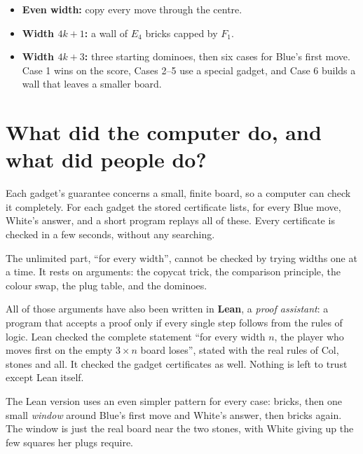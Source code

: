 \documentclass[11pt]{article}
\begin{document}
\begin{center}
\end{center}

\begin{itemize}
\item \textbf{Even width:} copy every move through the centre.
\item \textbf{Width $4k+1$:} a wall of $E_4$ bricks capped by $F_1$.
\item \textbf{Width $4k+3$:} three starting dominoes, then six cases for Blue's
first move. Case 1 wins on the score, Cases 2--5 use a special gadget, and
Case 6 builds a wall that leaves a smaller board.
\end{itemize}

\section{What did the computer do, and what did people do?}

Each gadget's guarantee concerns a small, finite board, so a computer can check
it completely. For each gadget the stored certificate lists, for every Blue
move, White's answer, and a short program replays all of these. Every
certificate is checked in a few seconds, without any searching.

The unlimited part, ``for every width'', cannot be checked by trying widths
one at a time. It rests on arguments: the copycat trick, the comparison
principle, the colour swap, the plug table, and the dominoes.

\begin{idea}
All of those arguments have also been written in \textbf{Lean}, a
\emph{proof assistant}: a program that accepts a proof only if every single
step follows from the rules of logic. Lean checked the complete statement
``for every width $n$, the player who moves first on the empty $3\times n$
board loses'', stated with the real rules of Col, stones and all. It checked
the gadget certificates as well. Nothing is left to trust except Lean
itself.
\end{idea}

The Lean version uses an even simpler pattern for every case: bricks, then
one small \emph{window} around Blue's first move and White's answer, then
bricks again. The window is just the real board near the two stones, with
White giving up the few squares her plugs require.

\begin{center}
\end{center}
\end{document}
